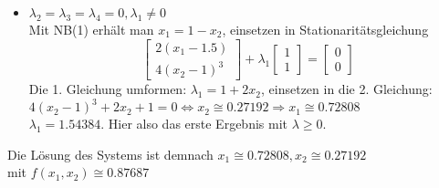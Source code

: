 \documentclass[a4paper, 12pt]{report}
\begin{document}
\begin{itemize}
  \item $\lambda_2 = \lambda_3 = \lambda_4 = 0, \lambda_1 \neq 0$\\
  Mit NB(1) erhält man $x_1 = 1 - x_2$, einsetzen in Stationaritätsgleichung
  $$\begin{bmatrix}2(x_1 - 1.5)\\4(x_2 -1)^3\end{bmatrix} + \lambda_1 \begin{bmatrix}1\\1\end{bmatrix} = \begin{bmatrix}0\\0\end{bmatrix}$$
  Die 1. Gleichung umformen: $\lambda_1 = 1 + 2x_2$, einsetzen in die 2. Gleichung:\\
  $4(x_2 - 1)^3 + 2x_2 + 1 = 0 \Leftrightarrow x_2 \cong 0.27192 \Rightarrow x_1 \cong 0.72808$\\
  $\lambda_1 = 1.54384$. Hier also das erste Ergebnis mit $\lambda \geq 0$.

\end{itemize}

Die Lösung des Systems ist demnach $x_1 \cong 0.72808, x_2 \cong 0.27192$\\
mit $f(x_1, x_2) \cong 0.87687$
\end{document}
